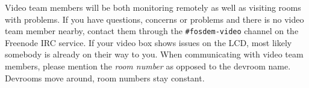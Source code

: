 \documentclass{article}
\begin{document}
Video team members will be both monitoring remotely as well as visiting rooms with problems. If you have questions, concerns or problems and there is no video team member nearby, contact them through the \texttt{\#fosdem-video} channel on the Freenode IRC service. If your video box shows issues on the LCD, most likely somebody is already on their way to you. When communicating with video team members, please mention the \emph{room number} as opposed to the devroom name. Devrooms move around, room numbers stay constant.
\end{document}

